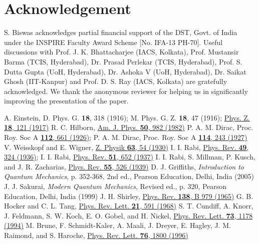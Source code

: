 \documentclass[aps,pra,twocolumn,showpacs,preprintnumbers,amsmath,amssymb,footinbib]{revtex4}
\def\prv#1#2#3{Phys. Rev. {\bf #1}, #2 (#3)}
\def\prl#1#2#3{Phys. Rev. Lett. {\bf #1}, #2 (#3)}
\def\ajp#1#2#3{Am. J. Phys. {\bf #1}, #2 (#3)}
\begin{document}
\section*{Acknowledgement}
S. Biswas acknowledges partial financial support of the DST, Govt. of India under the INSPIRE Faculty Award Scheme [No. IFA-13 PH-70]. Useful discussions with Prof. J. K. Bhattacharjee (IACS, Kolkata), Prof. Mustansir Barma (TCIS, Hyderabad), Dr. Prasad Perlekar (TCIS, Hyderabad), Prof. S. Dutta Gupta (UoH, Hyderabad), Dr. Ashoka V (UoH, Hyderabad), Dr. Saikat Ghosh (IIT-Kanpur) and Prof. D. S. Ray (IACS, Kolkata) are gratefully acknowledged. {We thank the anonymous reviewer for helping us in significantly improving the presentation of the paper.}

\begin{thebibliography}{99}
A. Einstein, D. Phys. G. \textbf{18}, 318 (1916); M. Phys. G. Z. \textbf{18}, 47 (1916); \href{http://web.ihep.su/dbserv/compas/src/einstein17/eng.pdf}{Phys. Z. \textbf{18}, 121 (1917)}
R. C. Hilborn, \href{http://dx.doi.org/10.1119/1.12937}{\ajp{50}{982}{1982}}
P. A. M. Dirac, Proc. Roy. Soc A  \href{http://dx.doi.org/10.1098/rspa.1926.0133}{\textbf{112}, 661 (1926)}; P. A. M. Dirac, Proc. Roy. Soc A  \href{http://dx.doi.org/10.1098/rspa.1927.0039}{\textbf{114}, 243 (1927)} 
V. Weisskopf and E. Wigner, \href{https://doi.org/10.1007/BF01336768}{Z. Physik \textbf{63}, 54 (1930)}
I. I. Rabi,  \href{http://dx.doi.org/10.1103/PhysRev.49.324}{\prv{49}{324}{1936}}; I. I. Rabi,  \href{http://dx.doi.org/10.1103/PhysRev.51.652}{\prv{51}{652}{1937}}
I. I. Rabi, S. Millman, P. Kusch, and J. R. Zacharias,  \href{http://dx.doi.org/10.1103/PhysRev.55.526}{\prv{55}{526}{1939}}
D. J. Griffiths, \textit{Introduction to Quantum Mechanics}, p. 352-368, 2nd ed., Pearson Education, Delhi, India (2005)
J. J. Sakurai, \textit{Modern Quantum Mechanics}, Revised ed., p. 320, Pearson Education, Delhi, India (1999)
J. H. Shirley, \href{http://dx.doi.org/10.1103/PhysRev.138.B979}{\prv{138}{B 979}{1965}}
G. B. Hocker and C. L. Tang,  \href{http://dx.doi.org/10.1103/PhysRevLett.21.591}{\prl{21}{591}{1968}}
S. T. Cundiff, A. Knorr, J. Feldmann, S. W. Koch, E. O. Gobel, and H. Nickel, \href{http://dx.doi.org/10.1103/PhysRevLett.73.1178}{\prl{73}{1178}{1994}}
M. Brune, F. Schmidt-Kaler, A. Maali, J. Dreyer, E. Hagley, J. M. Raimond, and S. Haroche,  \href{http://dx.doi.org/10.1103/PhysRevLett.76.1800}{\prl{76}{1800}{1996}}

\end{thebibliography}
\end{document}
